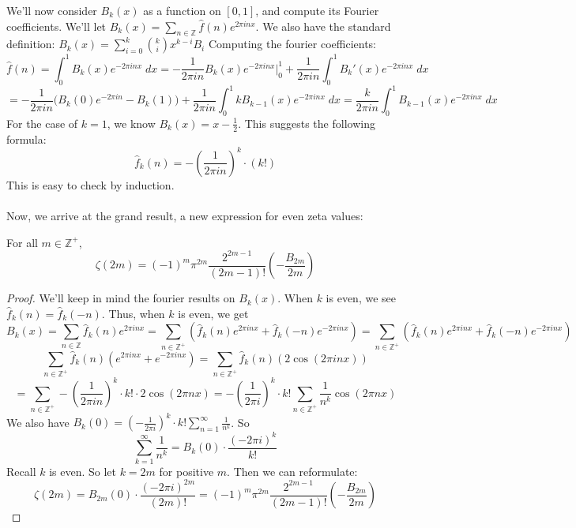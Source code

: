 We'll now consider $B_k(x)$ as a function on $[0, 1]$, and compute its
Fourier coefficients. We'll let $B_k(x)=\sum_{n\in\mathbb{Z}}\hat{f}(n)e^{2\pi inx}$. We also have the 
standard definition: $B_k(x)=\sum_{i=0}^k{k\choose i}x^{k-i}B_i$
Computing the fourier coefficients:
\[
    \hat{f}(n)=\int_0^1B_k(x)e^{-2\pi inx}\;dx = -\frac{1}{2\pi in}B_k(x)e^{-2\pi inx}\bigg|_0^1
    +\frac{1}{2\pi in}\int_0^1 B_k'(x)e^{-2\pi inx}\; dx 
\]
\[
    =-\frac{1}{2\pi in}\big(B_k(0)e^{-2\pi in}-B_k(1)\big)+\frac{1}{2\pi in}\int_0^1k
    B_{k-1}(x)e^{-2\pi inx}\;dx  
    = \frac{k}{2\pi in}\int_0^1B_{k-1}(x)e^{-2\pi inx}\; dx
\]
For the case of $k=1$, we know $B_k(x)=x-\frac{1}{2}$. This suggests the following 
formula: \[\hat{f}_k(n)=-(\frac{1}{2\pi in})^k\cdot(k!)\] This is easy to check by induction.\\\\
Now, we arrive at the grand result, a new expression for even zeta values:
\begin{theorem}
    For all $m\in\mathbb{Z}^+$, 
    \[
        \zeta(2m)=(-1)^m\pi^{2m}\frac{2^{2m-1}}{(2m-1)!}(-\frac{B_{2m}}{2m})
    \]
\end{theorem}
\begin{proof}
    We'll keep in mind the fourier results on $B_k(x)$. When $k$ is even, we see 
    $\hat{f}_k(n)=\hat{f}_k(-n)$.
    Thus, when $k$ is even, we get 
    \[
        B_k(x)=\sum_{n\in\mathbb{Z}}\hat{f}_k(n)e^{2\pi inx}=\sum_{n\in\mathbb{Z}^+}
        (\hat{f}_k(n)e^{2\pi inx}+\hat{f}_k(-n)e^{-2\pi inx}) = 
        \sum_{n\in\mathbb{Z}^+}
        (\hat{f}_k(n)e^{2\pi inx}+\hat{f}_k(-n)e^{-2\pi inx})
    \]
    \[
        \sum_{n\in\mathbb{Z}^+}\hat{f}_k(n)(e^{2\pi inx}+e^{-2\pi inx})
        = \sum_{n\in\mathbb{Z}^+}
        \hat{f}_k(n)(2\cos{(2\pi inx)})
    \]
    \[
        = \sum_{n\in\mathbb{Z}^+}-(\frac{1}{2\pi in})^k\cdot k!\cdot 2\cos(2\pi nx)=-(\frac{1}{2\pi i})^k\cdot
        k!\sum_{n\in\mathbb{Z}^+}\frac{1}{n^k}\cos{(2\pi nx)} 
    \]
    We also have $B_k(0)=(-\frac{1}{2\pi i})^k\cdot k!\sum_{n=1}^{\infty}\frac{1}{n^k}$.
    So 
    \[
        \sum_{k=1}^{\infty}\frac{1}{n^k}=B_k(0)\cdot\frac{(-2\pi i)^k}{k!}  
    \]
    Recall $k$ is even. So let $k=2m$ for positive $m$. Then we can reformulate:
    \[
        \zeta(2m)=B_{2m}(0)\cdot \frac{(-2\pi i)^{2m}}{(2m)!} = 
        (-1)^m\pi^{2m}\frac{2^{2m-1}}{(2m-1)!}(-\frac{B_{2m}}{2m})  
    \]
\end{proof}
